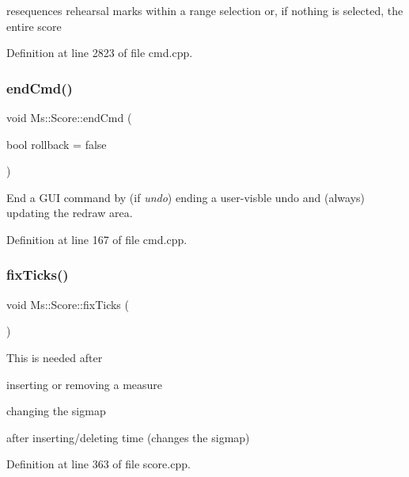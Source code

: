 resequences rehearsal marks within a range selection or, if nothing is selected, the entire score 

Definition at line 2823 of file cmd.\+cpp.

\mbox{\label{class_ms_1_1_score_ae629bd6513248811b5c7823836982ee8}} 
\subsubsection{\texorpdfstring{end\+Cmd()}{endCmd()}}
{\footnotesize\ttfamily void Ms\+::\+Score\+::end\+Cmd (\begin{DoxyParamCaption}\item[{bool}]{rollback = {\ttfamily false} }\end{DoxyParamCaption})}

End a G\+UI command by (if {\itshape undo}) ending a user-\/visble undo and (always) updating the redraw area. 

Definition at line 167 of file cmd.\+cpp.

\mbox{\label{class_ms_1_1_score_ab28ccdab6936e04e389008607ad70a52}} 
\subsubsection{\texorpdfstring{fix\+Ticks()}{fixTicks()}}
{\footnotesize\ttfamily void Ms\+::\+Score\+::fix\+Ticks (\begin{DoxyParamCaption}{ }\end{DoxyParamCaption})}

This is needed after
\begin{DoxyItemize}
\item inserting or removing a measure
\item changing the sigmap
\item after inserting/deleting time (changes the sigmap) 
\end{DoxyItemize}

Definition at line 363 of file score.\+cpp.

\mbox{\label{class_ms_1_1_score_a3582dc9e196e1e25bd9ed582fd818fa0}} 
